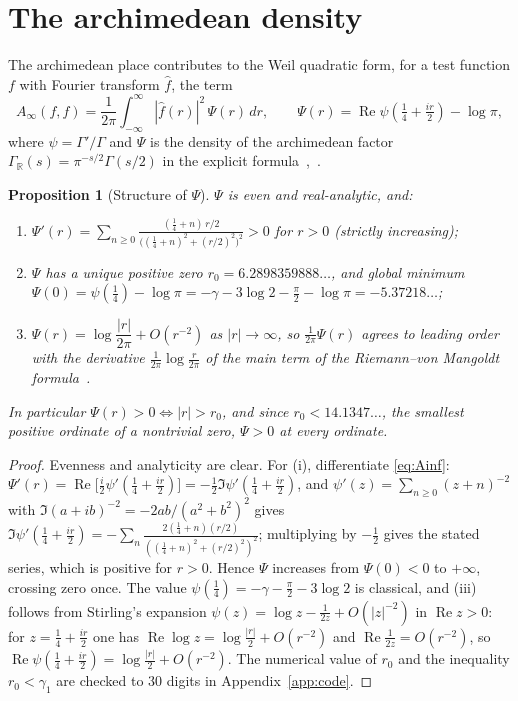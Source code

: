 \documentclass[11pt]{amsart}
\newtheorem{proposition}[theorem]{Proposition}
\theoremstyle{definition}
\theoremstyle{remark}
\newcommand{\Ainf}{A_\infty}
\DeclareMathOperator{\Real}{Re}
\begin{document}
\section{The archimedean density}\label{sec:psi}
The archimedean place contributes to the Weil quadratic form, for a test function
$f$ with Fourier transform $\widehat f$, the term
\begin{equation}\label{eq:Ainf}
\Ainf(f,f)=\frac1{2\pi}\int_{-\infty}^{\infty}|\widehat f(r)|^2\,\Psi(r)\,dr,
\qquad
\Psi(r)=\Real\psi\!\left(\tfrac14+\tfrac{ir}{2}\right)-\log\pi,
\end{equation}
where $\psi=\Gamma'/\Gamma$ and $\Psi$ is the density of the archimedean factor
$\Gamma_{\mathbb R}(s)=\pi^{-s/2}\Gamma(s/2)$ in the explicit
formula~\cite{Weil52},~\cite[Thm.~5.12]{bgIK}.

\begin{proposition}[Structure of $\Psi$]\label{prop:psi}
$\Psi$ is even and real-analytic, and:
\begin{enumerate}
\item[\rm(i)] $\Psi'(r)=\displaystyle\sum_{n\ge0}\frac{(\tfrac14+n)\,r/2}
{\bigl((\tfrac14+n)^2+(r/2)^2\bigr)^2}>0$ for $r>0$ (strictly increasing);
\item[\rm(ii)] $\Psi$ has a unique positive zero $r_0=6.2898359888\ldots$, and
global minimum $\Psi(0)=\psi(\tfrac14)-\log\pi=-\gamma-3\log2-\tfrac{\pi}{2}-\log\pi
=-5.37218\ldots$;
\item[\rm(iii)] $\Psi(r)=\log\dfrac{|r|}{2\pi}+O(r^{-2})$ as $|r|\to\infty$, so
$\tfrac1{2\pi}\Psi(r)$ agrees to leading order with the derivative
$\frac1{2\pi}\log\frac{r}{2\pi}$ of the main term of the Riemann--von Mangoldt
formula~\cite[\S9.4]{bgTitchmarsh}.
\end{enumerate}
In particular $\Psi(r)>0\iff|r|>r_0$, and since $r_0<14.1347\ldots$, the
smallest positive ordinate of a nontrivial zero, $\Psi>0$ at every ordinate.
\end{proposition}

\begin{proof}
Evenness and analyticity are clear. For (i), differentiate \eqref{eq:Ainf}:
$\Psi'(r)=\Real\bigl[\tfrac{i}{2}\psi'(\tfrac14+\tfrac{ir}{2})\bigr]
=-\tfrac12\Im\psi'(\tfrac14+\tfrac{ir}{2})$, and
$\psi'(z)=\sum_{n\ge0}(z+n)^{-2}$ with $\Im(a+ib)^{-2}=-2ab/(a^2+b^2)^2$ gives
$\Im\psi'(\tfrac14+\tfrac{ir}{2})=-\sum_n\frac{2(\tfrac14+n)(r/2)}
{((\tfrac14+n)^2+(r/2)^2)^2}$; multiplying by $-\tfrac12$ gives the stated
series, which is positive for $r>0$. Hence $\Psi$ increases from $\Psi(0)<0$ to
$+\infty$, crossing zero once. The value $\psi(\frac14)=-\gamma-\frac\pi2-3\log2$
is classical, and (iii) follows from Stirling's expansion
$\psi(z)=\log z-\tfrac1{2z}+O(|z|^{-2})$ in $\Real z>0$: for
$z=\tfrac14+\tfrac{ir}2$ one has $\Real\log z=\log\tfrac{|r|}2+O(r^{-2})$ and
$\Real\tfrac1{2z}=O(r^{-2})$, so
$\Real\psi(\tfrac14+\tfrac{ir}{2})=\log\tfrac{|r|}{2}+O(r^{-2})$. The numerical
value of $r_0$ and the inequality $r_0<\gamma_1$ are checked to $30$ digits in
Appendix~\ref{app:code}.
\end{proof}
\end{document}
